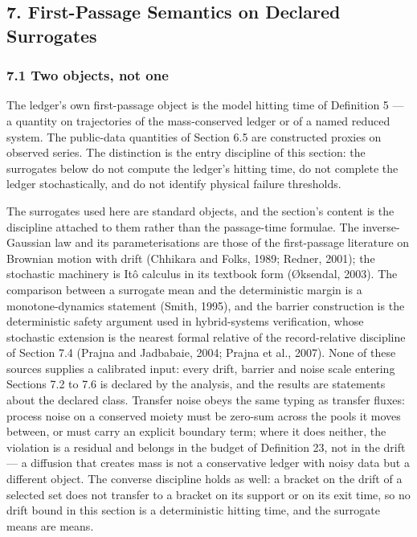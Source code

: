 \documentclass[11pt]{article}
\begin{document}
\subsection{7. First-Passage Semantics on Declared
Surrogates}\label{first-passage-semantics-on-declared-surrogates}

\subsubsection{7.1 Two objects, not one}\label{two-objects-not-one}

The ledger's own first-passage object is the model hitting time of
Definition 5 --- a quantity on trajectories of the mass-conserved ledger
or of a named reduced system. The public-data quantities of Section 6.5
are constructed proxies on observed series. The distinction is the entry
discipline of this section: the surrogates below do not compute the
ledger's hitting time, do not complete the ledger stochastically, and do
not identify physical failure thresholds.

The surrogates used here are standard objects, and the section's content is the discipline attached
to them rather than the passage-time formulae. The inverse-Gaussian law and its parameterisations are
those of the first-passage literature on Brownian motion with drift (Chhikara and Folks, 1989;
Redner, 2001); the stochastic machinery is It\^o calculus in its textbook form (\O{}ksendal, 2003). The
comparison between a surrogate mean and the deterministic margin is a monotone-dynamics statement
(Smith, 1995), and the barrier construction is the deterministic safety argument used in hybrid-systems
verification, whose stochastic extension is the nearest formal relative of the record-relative
discipline of Section 7.4 (Prajna and Jadbabaie, 2004; Prajna et al., 2007). None of these sources
supplies a calibrated input: every drift, barrier and noise scale entering Sections 7.2 to 7.6 is
declared by the analysis, and the results are statements about the declared class. Transfer noise obeys the same typing as
transfer fluxes: process noise on a conserved moiety must be zero-sum across the pools it moves between,
or must carry an explicit boundary term; where it does neither, the violation is a residual and belongs in
the budget of Definition 23, not in the drift --- a diffusion that creates mass is not a conservative ledger
with noisy data but a different object. The converse discipline holds as well: a bracket on the drift of a
selected set does not transfer to a bracket on its support or on its exit time, so no drift bound in this
section is a deterministic hitting time, and the surrogate means are means.
\end{document}
